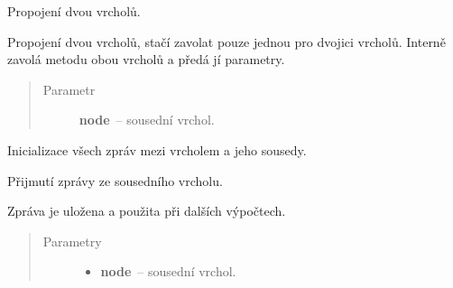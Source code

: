 \begin{fulllineitems}
\begin{fulllineitems}
\begin{quote}
\begin{description}
\end{description}\end{quote}

\end{fulllineitems}


\begin{fulllineitems}
\label{alex.infer:alex.infer.factor.alex.infer.node.DirichletFactorNode.connect}
Propojení dvou vrcholů.

Propojení dvou vrcholů, stačí zavolat pouze jednou pro dvojici vrcholů.
Interně zavolá metodu {\hyperref[alex.infer:alex.infer.factor.alex.infer.node.DirichletFactorNode.add_neighbor]{}} obou vrcholů a předá jí parametry.
\begin{quote}\begin{description}
\item[{Parametr}] \leavevmode
\textbf{node}~-- sousední vrchol.

\end{description}\end{quote}

\end{fulllineitems}


\begin{fulllineitems}
\label{alex.infer:alex.infer.factor.alex.infer.node.DirichletFactorNode.init_messages}
Inicializace všech zpráv mezi vrcholem a jeho sousedy.

\end{fulllineitems}


\begin{fulllineitems}
\label{alex.infer:alex.infer.factor.alex.infer.node.DirichletFactorNode.message_from}
Přijmutí zprávy ze sousedního vrcholu.

Zpráva je uložena a použita při dalších výpočtech.
\begin{quote}\begin{description}
\item[{Parametry}] \leavevmode\begin{itemize}
\item {} 
\textbf{node}~-- sousední vrchol.


\end{itemize}
\end{description}
\end{quote}
\end{fulllineitems}
\end{fulllineitems}
